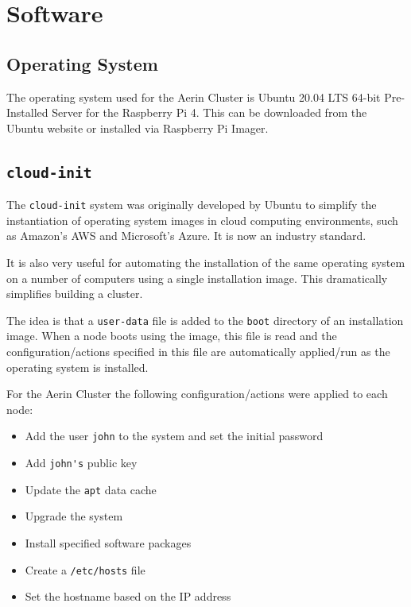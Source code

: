 \documentclass{report}
\begin{document}
%
%
\section{Software}


%
%
\subsection{Operating System}
The operating system used for the Aerin Cluster is Ubuntu 20.04 LTS 64-bit Pre-Installed Server for the Raspberry Pi 4. This can be downloaded from the Ubuntu website or installed via Raspberry Pi Imager.


%
%
\subsection{\texttt{cloud-init}}

The \verb|cloud-init| system was originally developed by Ubuntu to simplify the instantiation of operating system images in cloud computing environments, such as Amazon's AWS and Microsoft's Azure. It is now an industry standard.

It is also very useful for automating the installation of the same operating system on a number of computers using a single installation image. This dramatically simplifies building a cluster.

The idea is that a \verb|user-data| file is added to the \verb|boot| directory of an installation image. When a node boots using the image, this file is read and the configuration/actions specified in this file are automatically applied/run as the operating system is installed.

For the Aerin Cluster the following configuration/actions were applied to each node:

\begin{itemize}
\item Add the user \verb|john| to the system and set the initial password 
\item Add \verb|john's| public key
\item Update the \verb|apt| data cache
\item Upgrade the system
\item Install specified software packages
\item Create a \verb|/etc/hosts| file
\item Set the hostname based on the IP address
\end{itemize}
\end{document}

